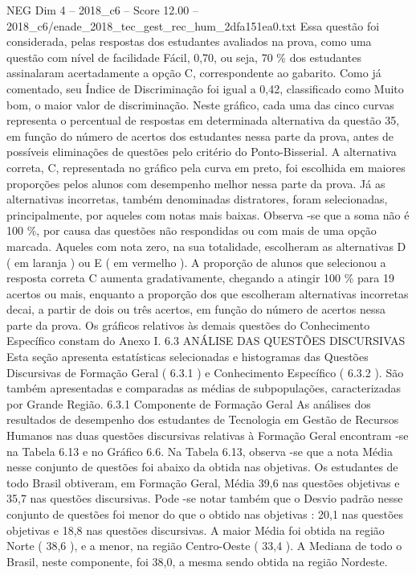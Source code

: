 \begin{textsample}{NEG Dim 4 – 2018\_c6 – Score 12.00 – 2018\_c6/enade\_2018\_tec\_gest\_rec\_hum\_2dfa151ea0.txt}
Essa questão foi considerada, pelas respostas dos estudantes avaliados na prova, como uma questão com nível de facilidade Fácil, 0,70, ou seja, 70 \% dos estudantes assinalaram acertadamente a opção C, correspondente ao gabarito.
Como já comentado, seu Índice de Discriminação foi igual a 0,42, classificado como Muito bom, o maior valor de discriminação.
Neste gráfico, cada uma das cinco curvas representa o percentual de respostas em determinada alternativa da questão 35, em função do número de acertos dos estudantes nessa parte da prova, antes de possíveis eliminações de questões pelo critério do Ponto-Bisserial.
A alternativa correta, C, representada no gráfico pela curva em preto, foi escolhida em maiores proporções pelos alunos com desempenho melhor nessa parte da prova.
Já as alternativas incorretas, também denominadas distratores, foram selecionadas, principalmente, por aqueles com notas mais baixas.
Observa -se que a soma não é 100 \%, por causa das questões não respondidas ou com mais de uma opção marcada.
Aqueles com nota zero, na sua totalidade, escolheram as alternativas D ( em laranja ) ou E ( em vermelho ).
A proporção de alunos que selecionou a resposta correta C aumenta gradativamente, chegando a atingir 100 \% para 19 acertos ou mais, enquanto a proporção dos que escolheram alternativas incorretas decai, a partir de dois ou três acertos, em função do número de acertos nessa parte da prova.
Os gráficos relativos às demais questões do Conhecimento Específico constam do Anexo I. 6.3 ANÁLISE DAS QUESTÕES DISCURSIVAS Esta seção apresenta estatísticas selecionadas e histogramas das Questões Discursivas de Formação Geral ( 6.3.1 ) e Conhecimento Específico ( 6.3.2 ).
São também apresentadas e comparadas as médias de subpopulações, caracterizadas por Grande Região. 6.3.1 Componente de Formação Geral As análises dos resultados de desempenho dos estudantes de Tecnologia em Gestão de Recursos Humanos nas duas questões discursivas relativas à Formação Geral encontram -se na Tabela 6.13 e no Gráfico 6.6.
Na Tabela 6.13, observa -se que a nota Média nesse conjunto de questões foi abaixo da obtida nas objetivas.
Os estudantes de todo Brasil obtiveram, em Formação Geral, Média 39,6 nas questões objetivas e 35,7 nas questões discursivas.
Pode -se notar também que o Desvio padrão nesse conjunto de questões foi menor do que o obtido nas objetivas : 20,1 nas questões objetivas e 18,8 nas questões discursivas.
A maior Média foi obtida na região Norte ( 38,6 ), e a menor, na região Centro-Oeste ( 33,4 ).
A Mediana de todo o Brasil, neste componente, foi 38,0, a mesma sendo obtida na região Nordeste.

\end{textsample}
